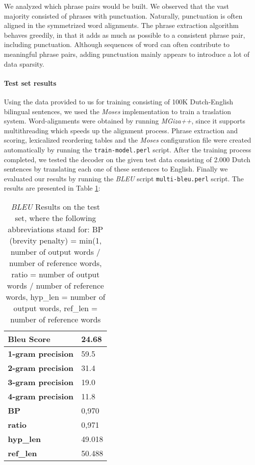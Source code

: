 \documentclass[11pt]{article}
\begin{document}
We analyzed which phrase pairs would be built. We observed that the vast majority consisted of phrases with punctuation. Naturally, punctuation is often aligned in the symmetrized word alignments. The phrase extraction algorithm behaves greedily, in that it adds as much as possible to a consistent phrase pair, including punctuation. Although sequences of word can often contribute to meaningful phrase pairs, adding punctuation mainly appears to introduce a lot of data sparsity. 


\paragraph{Test set results}
Using the data provided to us for training consisting of 100K Dutch-English bilingual sentences, we used the \textit{Moses} implementation to train a traslation system. Word-alignments were obtained by running \textit{MGiza++}, since it supports multithreading which speeds up the alignment process. Phrase extraction and scoring, lexicalized reordering tables and the \textit{Moses} configuration file were created automatically by running the \verb|train-model.perl| script. After the training process completed, we tested the decoder on the given test data consisting of 2.000 Dutch sentences by translating each one of these sentences to English. Finally we evaluated our results by running the \textit{BLEU} script \verb|multi-bleu.perl| script. The results are presented in Table \ref{bleuresults}:


\begin{table}[h]
\centering
\begin{tabular}{ l l }
  \hline \hline
  \textbf{Bleu Score} & 24.68 \\
  \hline \hline
  \textbf{1-gram precision} & 59.5 \\
  \textbf{2-gram precision} & 31.4 \\
  \textbf{3-gram precision} & 19.0 \\
  \textbf{4-gram precision} & 11.8 \\
  \hline \hline
  \textbf{BP} & 0,970 \\
  \textbf{ratio} & 0,971 \\
  \textbf{hyp\_len} & 49.018 \\
  \textbf{ref\_len} & 50.488 \\
  \hline \hline
\end{tabular}
\caption{\textit{BLEU} Results on the test set, where the following abbreviations stand for: BP (brevity penalty) = min(1, number of output words / number of reference words, ratio = number of output words / number of reference words, hyp\_len = number of output words, ref\_len = number of reference words}
\label{bleuresults}
\end{table}
\end{document}
